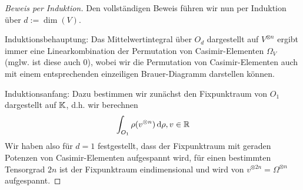 \begin{proof}[Beweis per Induktion]
\medbreak
Den vollständigen Beweis führen wir nun per Induktion über $d:=\dim(V)$.

Induktionsbehauptung: 
Das Mittelwertintegral über $O_d$ dargestellt auf $V^{\otimes n}$ ergibt immer eine Linearkombination der Permutation von Casimir-Elementen $\Omega_{V}$ (mglw. ist diese auch $0$), wobei wir die Permutation von Casimir-Elementen auch mit einem entsprechenden einzeiligen Brauer-Diagramm darstellen können.
 
Induktionsanfang:
Dazu bestimmen wir zunächst den Fixpunktraum von $O_1$ dargestellt auf $\mathbb{K}$, d.h. wir berechnen
\[
\int_{O_1} \rho (v^{\otimes n}) \,\textrm{d} \rho, v\in\mathbb{R}
\]
Wir haben also für $d=1$ festgestellt, dass der Fixpunktraum mit geraden Potenzen von Casimir-Elementen aufgespannt wird, für einen bestimmten Tensorgrad $2n$ ist der Fixpunktraum eindimensional und wird von $v^{\otimes 2n}=\Omega^{\otimes n}$ aufgespannt.


\end{proof}
